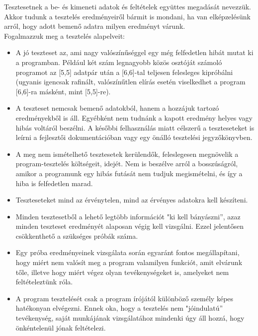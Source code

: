 \documentclass[margin=0px]{article}
\begin{document}
	Tesztesetnek a be- és kimeneti adatok és feltételek együttes megadását nevezzük. Akkor tudunk a tesztelés eredményeiről bármit is mondani, ha van elképzelésünk arról, hogy adott bemenő adatra milyen eredményt várunk.\\
	
	\noindent Fogalmazzuk meg a tesztelés alapelveit:
	\begin{itemize}
		\item 	A jó teszteset az, ami nagy valószínűséggel egy még felfedetlen hibát mutat ki a programban. Például két szám legnagyobb közös osztóját számoló programot az [5,5] adatpár után a [6,6]-tal teljesen felesleges kipróbálni (ugyanis igencsak rafinált, valószínűtlen elírás esetén viselkedhet a program [6,6]-ra másként, mint [5,5]-re).
	
		\item 	A teszteset nemcsak bemenő adatokból, hanem a hozzájuk tartozó eredményekből is áll. Egyébként nem tudnánk a kapott eredmény helyes vagy hibás voltáról beszélni. A későbbi felhasználás miatt célszerű a teszteseteket is leírni a fejlesztői dokumentációban vagy egy önálló tesztelési jegyzőkönyvben.
	
		\item	A meg nem ismételhető tesztesetek kerülendők, feleslegesen megnövelik a program-tesztelés költségeit, idejét. Nem is beszélve arról a bosszúságról, amikor a programunk egy hibás futását nem tudjuk megismételni, és így a hiba is felfedetlen marad.
		
		\item	Teszteseteket mind az érvénytelen, mind az érvényes adatokra kell készíteni.
		
		\item 	Minden tesztesetből a lehető legtöbb információt "ki kell bányászni”, azaz minden teszteset eredményét alaposan végig kell vizsgálni. Ezzel jelentősen csökkenthető a szükséges próbák száma.
		
		\item	Egy próba eredményeinek vizsgálata során egyaránt fontos megállapítani, hogy miért nem valósít meg a program valamilyen funkciót, amit elvárunk tőle, illetve hogy miért végez olyan tevékenységeket is, amelyeket nem feltételeztünk róla.
	
		\item	A program tesztelését csak a program írójától különböző személy képes hatékonyan elvégezni. Ennek oka, hogy a tesztelés nem "jóindulatú” tevékenység, saját munkájának vizsgálatához mindenki úgy áll hozzá, hogy önkéntelenül jónak feltételezi.
	\end{itemize}
	
\end{document}
